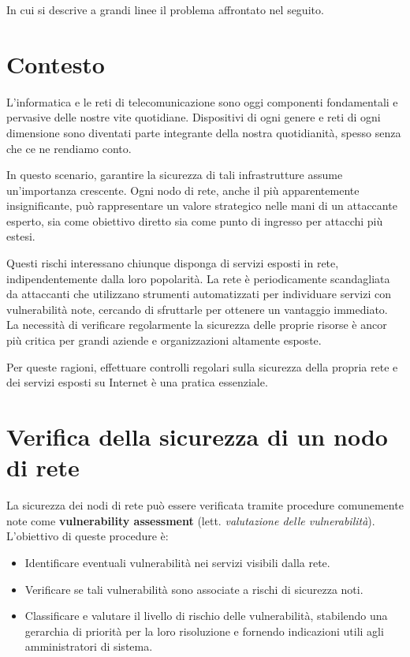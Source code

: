 In cui si descrive a grandi linee il problema affrontato nel seguito.

\section{Contesto}
L'informatica e le reti di telecomunicazione sono oggi componenti fondamentali e pervasive delle nostre vite quotidiane. Dispositivi di ogni genere e reti di ogni dimensione sono diventati parte integrante della nostra quotidianità, spesso senza che ce ne rendiamo conto.

In questo scenario, garantire la sicurezza di tali infrastrutture assume un'importanza crescente. Ogni nodo di rete, anche il più apparentemente insignificante, può rappresentare un valore strategico nelle mani di un attaccante esperto, sia come obiettivo diretto sia come punto di ingresso per attacchi più estesi.

Questi rischi interessano chiunque disponga di servizi esposti in rete, indipendentemente dalla loro popolarità. La rete è periodicamente scandagliata da attaccanti che utilizzano strumenti automatizzati per individuare servizi con vulnerabilità note, cercando di sfruttarle per ottenere un vantaggio immediato. La necessità di verificare regolarmente la sicurezza delle proprie risorse è ancor più critica per grandi aziende e organizzazioni altamente esposte.

Per queste ragioni, effettuare controlli regolari sulla sicurezza della propria rete e dei servizi esposti su Internet è una pratica essenziale.

\section{Verifica della sicurezza di un nodo di rete}
La sicurezza dei nodi di rete può essere verificata tramite procedure comunemente note come \textbf{vulnerability assessment} (lett. \emph{valutazione delle vulnerabilità}). L'obiettivo di queste procedure è:
\begin{itemize}
    \item Identificare eventuali vulnerabilità nei servizi visibili dalla rete.
    \item Verificare se tali vulnerabilità sono associate a rischi di sicurezza noti.
    \item Classificare e valutare il livello di rischio delle vulnerabilità, stabilendo una gerarchia di priorità per la loro risoluzione e fornendo indicazioni utili agli amministratori di sistema.
\end{itemize}

